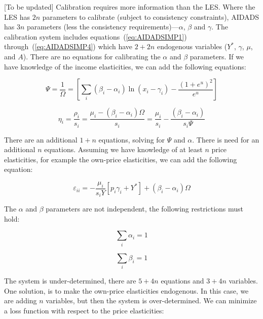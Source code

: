 [To be updated] Calibration requires more information than the LES. Where the LES has $2n$
parameters to calibrate (subject to consistency constraints), AIDADS has $3n$ parameters
(less the consistency requirements)---$\alpha$, $\beta$ and $\gamma$. The calibration system
includes equations~(\ref{eq:AIDADSIMP1}) through~(\ref{eq:AIDADSIMP4}) which have $2+2n$ endogenous
variables ($Y^*$, $\gamma$, $\mu$, and $A$). There are no equations for calibrating the $\alpha$
and $\beta$ parameters. If we have knowledge of the income elasticities, we can add the following
equations:

\begin{equation}
\label{eq:AIDADSIMP5}
\Psi  = \frac{1}{\Omega } = \left[ {\sum\limits_i {\left( {{\beta _i} - {\alpha _i}} \right)
   \ln \left( {{x_i} - {\gamma _i}} \right) -
   \frac{{{{\left( {1 + {e^u}} \right)}^2}}}{{{e^u}}}} } \right]
\end{equation}

\begin{equation}
\label{eq:AIDADSIMP6}
{\eta _i} = \frac{{{\rho _i}}}{{{s_i}}} = \frac{{{\mu _i} - \left( {{\beta _i}
- {\alpha _i}} \right) \Omega }}{{{s_i}}} = \frac{{{\mu _i}}}{{{s_i}}} -
   \frac{{\left( {{\beta _i} - {\alpha _i}} \right)}}{{{s_i}\Psi }}
\end{equation}

There are an additional $1+n$ equations, solving for $\Psi$ and $\alpha$. There is need for an
additional $n$ equations. Assuming we have knowledge of at least $n$ price elasticities, for example
the own-price elasticities, we can add the following equation:

\begin{equation}
\label{eq:AIDADSIMP7}
{\varepsilon _{ii}} =  - \frac{{{\mu _i}}}{{{s_i}Y}}\left[ {{p_i}{\gamma _i} + {Y^*}} \right] +
   \left( {{\beta _i} - {\alpha _i}} \right)\Omega
\end{equation}

The $\alpha$ and $\beta$ parameters are not independent, the following restrictions must hold:

\begin{equation}
\label{eq:AIDADSIMP8}
\sum\limits_i {{\alpha_i} = 1}
\end{equation}

\begin{equation}
\label{eq:AIDADSIMP9}
\sum\limits_i {{\beta_i} = 1}
\end{equation}

The system is under-determined, there are $5+4n$ equations and $3+4n$ variables. One solution, is
to make the own-price elasticities endogenous. In this case, we are adding $n$ variables, but then
the system is over-determined. We can minimize a loss function with respect to the
price elasticities:

